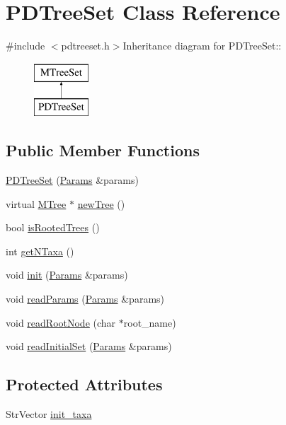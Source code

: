 \hypertarget{classPDTreeSet}{
\section{PDTreeSet Class Reference}
\label{classPDTreeSet}
}


{\ttfamily \#include $<$pdtreeset.h$>$}Inheritance diagram for PDTreeSet::\begin{figure}[H]
\begin{center}
\leavevmode
\includegraphics[height=2cm]{classPDTreeSet}
\end{center}
\end{figure}
\subsection*{Public Member Functions}
\begin{DoxyCompactItemize}
\item 
\hyperlink{classPDTreeSet_a168d632f3e858ba8e8c714e8ab85fa45}{PDTreeSet} (\hyperlink{structParams}{Params} \&params)
\item 
virtual \hyperlink{classMTree}{MTree} $\ast$ \hyperlink{classPDTreeSet_a0af6b254e9faff292db3684ec6089e24}{newTree} ()
\item 
bool \hyperlink{classPDTreeSet_ac7e97a1b3130b4b06ce154db0d8f50b9}{isRootedTrees} ()
\item 
int \hyperlink{classPDTreeSet_a9ae4ee3a64ffc0556514a9ea206b9949}{getNTaxa} ()
\item 
void \hyperlink{classPDTreeSet_aabbf34120793461a61cb099aa1095cf2}{init} (\hyperlink{structParams}{Params} \&params)
\item 
void \hyperlink{classPDTreeSet_af2a27a3ed80adb54c44c7cc3f2f43bc1}{readParams} (\hyperlink{structParams}{Params} \&params)
\item 
void \hyperlink{classPDTreeSet_a4ddfd3ac840458f8c73d9b8ff0b03bbc}{readRootNode} (char $\ast$root\_\-name)
\item 
void \hyperlink{classPDTreeSet_a4c5e9cac8a799ad0c2365cfd27dbf153}{readInitialSet} (\hyperlink{structParams}{Params} \&params)
\end{DoxyCompactItemize}
\subsection*{Protected Attributes}
\begin{DoxyCompactItemize}
\item 
StrVector \hyperlink{classPDTreeSet_ae0a51247792a6dc0d1ac141c8beb2ad1}{init\_\-taxa}
\end{DoxyCompactItemize}


